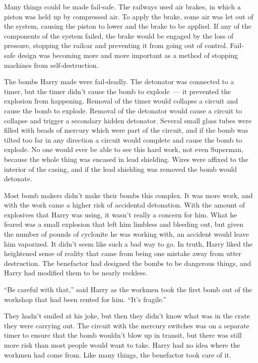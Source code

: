 Many things could be made fail‐safe. The railways used air brakes, in
which a piston was held up by compressed air. To apply the brake, some
air was let out of the system, causing the piston to lower and the brake
to be applied. If any of the components of the system failed, the brake
would be engaged by the loss of pressure, stopping the railcar and
preventing it from going out of control. Fail‐safe design was becoming
more and more important as a method of stopping machines from
self‐destruction.

The bombs Harry made were fail‐deadly. The detonator was connected to a
timer, but the timer didn't cause the bomb to explode~--- it prevented
the explosion from happening. Removal of the timer would collapse a
circuit and cause the bomb to explode. Removal of the detonator would
cause a circuit to collapse and trigger a secondary hidden detonator.
Several small glass tubes were filled with beads of mercury which were
part of the circuit, and if the bomb was tilted too far in any direction
a circuit would complete and cause the bomb to explode. No one would
ever be able to see this hard work, not even Superman, because the whole
thing was encased in lead shielding. Wires were affixed to the interior
of the casing, and if the lead shielding was removed the bomb would
detonate.

Most bomb makers didn't make their bombs this complex. It was more work,
and with the work came a higher risk of accidental detonation. With the
amount of explosives that Harry was using, it wasn't really a concern
for him. What he feared was a small explosion that left him limbless and
bleeding out, but given the number of pounds of cyclonite he was working
with, an accident would leave him vaporized. It didn't seem like such a
bad way to go. In truth, Harry liked the heightened sense of reality
that came from being one mistake away from utter destruction. The
benefactor had designed the bombs to be dangerous things, and Harry had
modified them to be nearly reckless.

``Be careful with that,'' said Harry as the workmen took the first bomb
out of the workshop that had been rented for him. ``It's fragile.''

They hadn't smiled at his joke, but then they didn't know what was in
the crate they were carrying out. The circuit with the mercury switches
was on a separate timer to ensure that the bomb wouldn't blow up in
transit, but there was still more risk than most people would want to
take. Harry had no idea where the workmen had come from. Like many
things, the benefactor took care of it.

